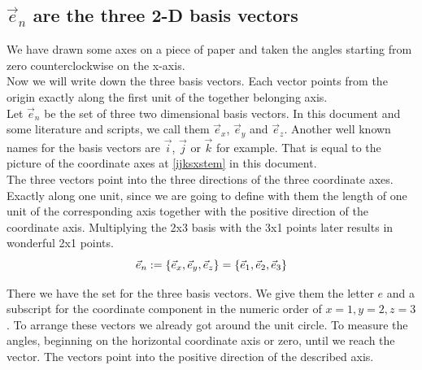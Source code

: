 \documentclass[a4paper]{article}
\begin{document}
\subsection{$\vec{e}_{n}$ are the three 2-D basis vectors}

We have drawn some axes on a piece of paper and taken the angles starting from zero counterclockwise on the x-axis.\\

Now we will write down the three basis vectors. Each vector points from the origin exactly along the first unit of the together belonging axis.\\

Let $\vec{e}_{n}$ be the set of three two dimensional basis vectors. In this document and some literature and scripts,
we call them $\vec{e}_x$, $\vec{e}_y$ and $\vec{e}_z$. Another well known names for the basis vectors are $\vec{i}$, 
$\vec{j}$ or $\vec{k}$ for example. That is equal to the picture of the coordinate axes at \ref{ijksxstem} in this document.\\

The three vectors point into the three directions of the three coordinate axes. Exactly along one unit, since we are going
to define with them the length of one unit of the corresponding axis together with the positive direction of the coordinate axis.
Multiplying the 2x3 basis with the 3x1 points later results in wonderful 2x1 points. \\

\begin{displaymath}
\vec{e}_{n} := \{\vec{e}_x, \vec{e}_y, \vec{e}_z\} = \{\vec{e}_1, \vec{e}_2, \vec{e}_3\}\\
\end{displaymath} 

There we have the set for the three basis vectors. We give them the letter $e$ and a subscript for the coordinate component in the numeric order of $x=1, y=2, z=3$. To arrange these vectors we already got around the unit circle. To measure the angles, beginning on the horizontal coordinate axis or zero, until we reach the vector. The vectors point into the positive direction of the described axis.\\
\end{document}
